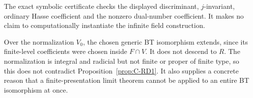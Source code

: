 \begin{remark}
The exact symbolic certificate 
checks the displayed discriminant, $j$-invariant, ordinary Hasse
coefficient and the nonzero dual-number coefficient. It makes no
claim to computationally instantiate the infinite field construction.
\end{remark}

\begin{remark}
Over the normalization $V_0$, the chosen generic BT isomorphism
extends, since its finite-level coefficients were chosen inside
$F\cap V$. It does not descend to $R$. The normalization is integral
and radicial but not finite or proper of finite type, so this does
not contradict Proposition~\ref{prop:C-RD1}. It also supplies a
concrete reason that a finite-presentation limit theorem cannot be
applied to an entire BT isomorphism at once.
\end{remark}
